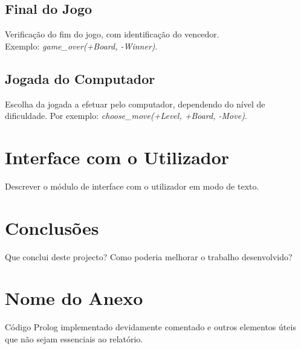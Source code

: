 \documentclass[a4paper]{article}
\begin{document}
\subsection{Final do Jogo} Verificação do fim do jogo, com identificação do vencedor. \\Exemplo: \textit{game\_over(+Board, -Winner)}.

\subsection{Jogada do Computador} Escolha da jogada a efetuar pelo computador, dependendo do nível de dificuldade. Por exemplo: \textit{choose\_move(+Level, +Board, -Move)}.


\section{Interface com o Utilizador}

Descrever o módulo de interface com o utilizador em modo de texto.


\section{Conclusões}
Que conclui deste projecto? Como poderia melhorar o trabalho desenvolvido?


\clearpage
%
%

\newpage
\appendix
\section{Nome do Anexo}
Código Prolog implementado devidamente comentado e outros elementos úteis que não sejam essenciais ao relatório.
\end{document}
